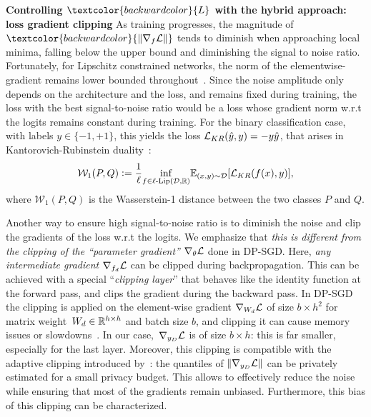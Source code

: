 \textbf{Controlling $\textcolor{backwardcolor}{L}$ with the hybrid approach: loss gradient clipping}\label{sec:lossgradclip} 
    As training progresses, the magnitude of $\textcolor{backwardcolor}{\|\nabla_f \Loss\|}$ tends to diminish when approaching local minima, falling below the upper bound and diminishing the signal to noise ratio. Fortunately, for Lipschitz constrained networks, the norm of the elementwise-gradient remains lower bounded throughout~\citep{bethune2022pay}. Since the noise amplitude only depends on the architecture and the loss, and remains fixed during training, the loss with the best signal-to-noise ratio would be a loss whose gradient norm w.r.t the logits remains constant during training. For the binary classification case, with labels $y\in\{-1,+1\}$, this yields the loss $\mathcal{L}_{KR}(\hat y, y)=-y\hat y$, that arises in Kantorovich-Rubinstein duality~\citep{villani2008optimal}:
    \begin{equation}
        \mathcal{W}_1(P,Q)\vcentcolon= \frac{1}{\ell}\underset{f\in\text{$\ell$-Lip}(\mathcal{D},\mathbb{R})}{\inf}\mathbb{E}_{(x,y)\sim\mathcal{D}}[\mathcal{L}_{KR}(f(x), y)],
    \end{equation}
    where $\mathcal{W}_1(P,Q)$ is the Wasserstein-1 distance between the two classes $P$ and $Q$.%

    Another way to ensure high signal-to-noise ratio is to diminish the noise and clip the gradients of the loss w.r.t the logits. We emphasize that \textit{this is different from the clipping of the ``parameter gradient'' $\nabla_{\theta}\mathcal{L}$} done in DP-SGD. Here, \textit{any intermediate gradient $\nabla_{f_d}\mathcal{L}$} can be clipped during backpropagation. This can be achieved with a special ``\textit{clipping layer}'' that behaves like the identity function at the forward pass, and clips the gradient during the backward pass. In DP-SGD the clipping is applied on the element-wise gradient $\nabla_{W_d}\mathcal{L}$ of size $b\times h^2$ for matrix weight~${W_d\in\mathbb{R}^{h\times h}}$ and batch size $b$, and clipping it can cause memory issues or slowdowns~\citep{lee2021scaling}. In our case,~$\nabla_{y_D}\mathcal{L}$ is of size $b\times h$: this is far smaller, especially for the last layer. Moreover, this clipping is compatible with the adaptive clipping introduced by~\citep{andrew2021differentially}: the quantiles of $\|\nabla_{y_D}\mathcal{L}\|$ can be privately estimated for a small privacy budget. This allows to effectively reduce the noise while ensuring that most of the gradients remain unbiased. Furthermore, this bias of this clipping can be characterized.  
    

